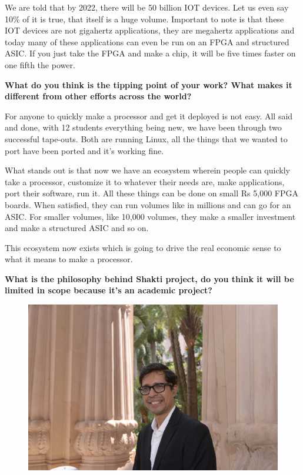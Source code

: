\begin{multicols}{2}
We are told that by 2022, there will be 50 billion IOT devices. Let us even say 10\% of it is true, that itself is a huge volume. Important to note is that these IOT devices are not gigahertz applications, they are megahertz applications and today many of these applications can even be run on an FPGA and structured ASIC. If you just take the FPGA and make a chip, it will be five times faster on one fifth the power.


{\bf What do you think is the tipping point of your work? What makes it different from other efforts across the world?}

For anyone to quickly make a processor and get it deployed is not easy. All said and done, with 12 students everything being new, we have been through two successful tape-outs. Both are running Linux, all the things that we wanted to port have been ported and it's working fine.

What stands out is that now we have an ecosystem wherein people can quickly take a processor, customize it to whatever their needs are, make applications, port their software, run it. All these things can be done on small Rs 5,000 FPGA boards. When satisfied, they can run volumes like in millions and can go for an ASIC. For smaller volumes, like 10,000 volumes, they make a smaller investment and make a structured ASIC and so on. 

This ecosystem now exists which is going to drive the real economic sense to what it means to make a processor.

{\bf What is the philosophy behind Shakti project, do you think it will be limited in scope because it's an academic project?}

\begin{figure}[H]
\centering
\includegraphics{src/Figures/authors/Kamakoti1.jpg}
\end{figure}
\vskip -0.6cm


\end{multicols}
